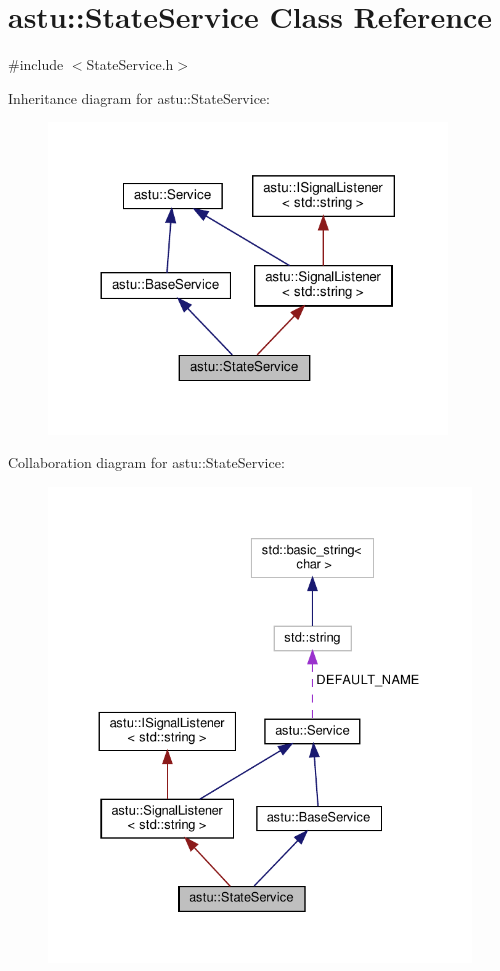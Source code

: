 \hypertarget{classastu_1_1StateService}{}\section{astu\+:\+:State\+Service Class Reference}
\label{classastu_1_1StateService}


{\ttfamily \#include $<$State\+Service.\+h$>$}



Inheritance diagram for astu\+:\+:State\+Service\+:\nopagebreak
\begin{figure}[H]
\begin{center}
\leavevmode
\includegraphics[width=300pt]{classastu_1_1StateService__inherit__graph}
\end{center}
\end{figure}


Collaboration diagram for astu\+:\+:State\+Service\+:\nopagebreak
\begin{figure}[H]
\begin{center}
\leavevmode
\includegraphics[width=330pt]{classastu_1_1StateService__coll__graph}
\end{center}
\end{figure}
